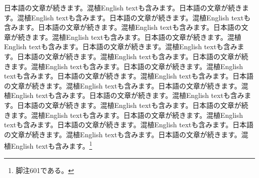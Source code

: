 \documentclass[pdflatex,book]{jlreq}
\begin{document}
日本語の文章が続きます。混植English textも含みます。日本語の文章が続きます。混植English textも含みます。日本語の文章が続きます。混植English textも含みます。日本語の文章が続きます。混植English textも含みます。日本語の文章が続きます。混植English textも含みます。日本語の文章が続きます。混植English textも含みます。日本語の文章が続きます。混植English textも含みます。日本語の文章が続きます。混植English textも含みます。日本語の文章が続きます。混植English textも含みます。日本語の文章が続きます。混植English textも含みます。日本語の文章が続きます。混植English textも含みます。日本語の文章が続きます。混植English textも含みます。日本語の文章が続きます。混植English textも含みます。日本語の文章が続きます。混植English textも含みます。日本語の文章が続きます。混植English textも含みます。日本語の文章が続きます。混植English textも含みます。日本語の文章が続きます。混植English textも含みます。日本語の文章が続きます。混植English textも含みます。日本語の文章が続きます。混植English textも含みます。日本語の文章が続きます。混植English textも含みます。\footnote{脚注601である。}
\end{document}
